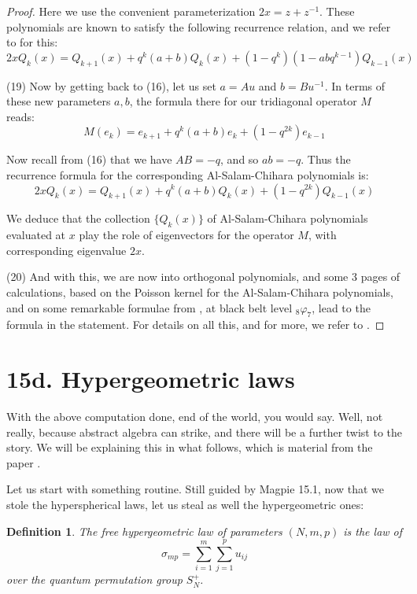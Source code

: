 \documentclass[12pt]{amsbook}
\newtheorem{definition}[theorem]{Definition}
\begin{document}
\begin{proof}
Here we use the convenient parameterization $2x=z+z^{-1}$. These polynomials are known to satisfy the following recurrence relation, and we refer to \cite{awi} for this:
$$2xQ_k(x)=Q_{k+1}(x)+q^k(a+b)Q_k(x)+(1-q^k)(1-abq^{k-1})Q_{k-1}(x)$$

(19) Now by getting back to (16), let us set $a=Au$ and $b=Bu^{-1}$. In terms of these new parameters $a,b$, the formula there for our tridiagonal operator $M$ reads:
$$M(e_k)=e_{k+1}+q^k(a+b)e_k+(1-q^{2k})e_{k-1}$$

Now recall from (16) that we have $AB=-q$, and so $ab=-q$. Thus the recurrence formula for the corresponding Al-Salam-Chihara polynomials is:
$$2xQ_k(x)=Q_{k+1}(x)+q^k(a+b)Q_k(x)+(1-q^{2k})Q_{k-1}(x)$$

We deduce that the collection $\{Q_k(x)\}$ of Al-Salam-Chihara polynomials evaluated at $x$ play the role of eigenvectors for the operator $M$, with corresponding eigenvalue $2x$.

\medskip

(20) And with this, we are now into orthogonal polynomials, and some 3 pages of calculations, based on the Poisson kernel for the Al-Salam-Chihara polynomials, and on some remarkable formulae from \cite{ars}, at black belt level ${}_8\varphi_7$, lead to the formula in the statement. For details on all this, and for more, we refer to \cite{bcz}. 
\end{proof}

\section*{15d. Hypergeometric laws}

With the above computation done, end of the world, you would say. Well, not really, because abstract algebra can strike, and there will be a further twist to the story. We will be explaining this in what follows, which is material from the paper \cite{bbc}. 

\bigskip

Let us start with something routine. Still guided by Magpie 15.1, now that we stole the hyperspherical laws, let us steal as well the hypergeometric ones:


\begin{definition}
The free hypergeometric law of parameters $(N,m,p)$ is the law of
$$\sigma_{mp}=\sum_{i=1}^m\sum_{j=1}^pu_{ij}$$
over the quantum permutation group $S_N^+$.
\end{definition}
\end{document}
